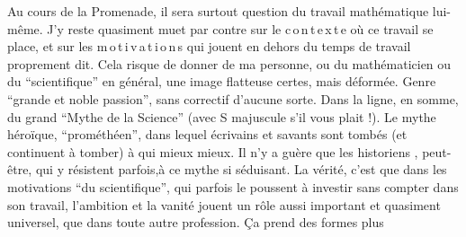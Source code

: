 Au cours de la Promenade, il sera surtout question du travail mathématique lui-même. J'y reste quasiment muet par contre sur le c\,o\,n\,t\,e\,x\,t\,e où ce travail se place, et sur les m\,o\,t\,i\,v\,a\,t\,i\,o\,n\,s qui jouent en dehors du temps de travail proprement dit. Cela risque de donner de ma personne, ou du mathématicien ou du ``scientifique'' en général, une image flatteuse certes, mais déformée. Genre ``grande et noble passion'', sans correctif d'aucune sorte. Dans la ligne, en somme, du grand ``Mythe de la Science'' (avec S majuscule s'il vous plait !). Le mythe héroïque, ``prométhéen'', dans lequel écrivains et savants sont tombés (et continuent à tomber) à qui mieux mieux. Il n'y a guère que les historiens , peut-être, qui y résistent parfois,à ce mythe si séduisant. La vérité, c'est que dans les motivations ``du scientifique'', qui parfois le poussent à investir sans compter dans son travail, l'ambition et la vanité jouent un rôle aussi important et quasiment universel, que dans toute autre profession. Ça prend des formes plus


